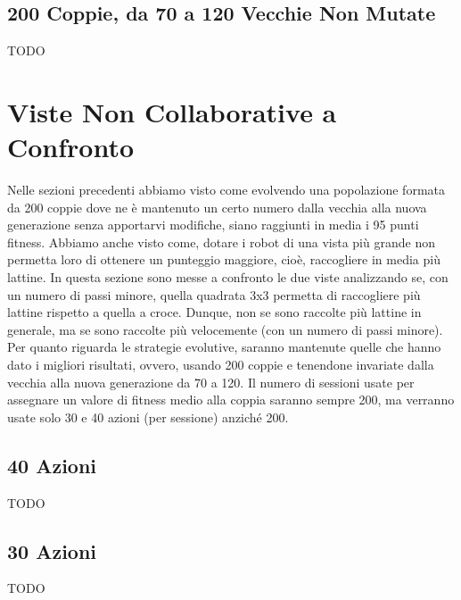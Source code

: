\subsection{200 Coppie, da 70 a 120 Vecchie Non Mutate}
TODO



\section{Viste Non Collaborative a Confronto}
Nelle sezioni precedenti abbiamo visto come evolvendo una popolazione formata da
200 coppie dove ne è mantenuto un certo numero dalla vecchia alla nuova
generazione senza apportarvi modifiche, siano raggiunti in media i 95 punti
fitness. Abbiamo anche visto come, dotare i robot di una vista più grande non
permetta loro di ottenere un punteggio maggiore, cioè, raccogliere in media più
lattine.\newline
In questa sezione sono messe a confronto le due viste analizzando se, con un
numero di passi minore, quella quadrata 3x3 permetta di raccogliere più lattine
rispetto a quella a croce. Dunque, non se sono raccolte più lattine in generale,
ma se sono raccolte più velocemente (con un numero di passi minore).\newline
Per quanto riguarda le strategie evolutive, saranno mantenute quelle che hanno
dato i migliori risultati, ovvero, usando 200 coppie e tenendone invariate dalla
vecchia alla nuova generazione da 70 a 120. Il numero di sessioni usate per
assegnare un valore di fitness medio alla coppia saranno sempre 200, ma verranno
usate solo 30 e 40 azioni (per sessione) anziché 200.

\subsection{40 Azioni}
TODO

\subsection{30 Azioni}
TODO
